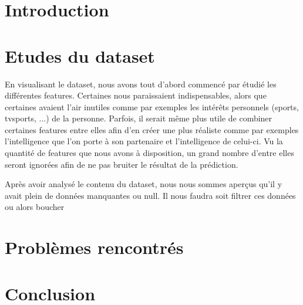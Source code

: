 \section{Introduction}



\section{Etudes du dataset}
En visualisant le dataset, nous avons tout d'abord commencé par étudié les différentes features. Certaines nous paraissaient indispensables, alors que certaines avaient l'air inutiles comme par exemples les intérêts personnels (sports, tvsports, ...) de la personne.
Parfois, il serait même plus utile de combiner certaines features entre elles afin d'en créer une plus réaliste comme par exemples l'intelligence que l'on porte à son partenaire et l'intelligence de celui-ci.
Vu la quantité de features que nous avons à disposition, un grand nombre d'entre elles seront ignorées afin de ne pas bruiter le résultat de la prédiction.

Après avoir analysé le contenu du dataset, nous nous sommes aperçus qu'il y avait plein de données manquantes ou null. Il nous faudra soit filtrer ces données ou alors boucher 


\section{Problèmes rencontrés}


\section{Conclusion}